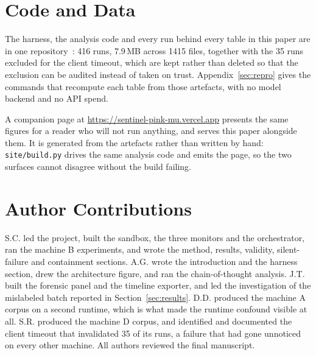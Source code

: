 \section*{Code and Data}

The harness, the analysis code and every run behind every table in this paper
are in one repository~\cite{sentinel-repo}: 416 runs, 7.9\,MB across 1415
files, together with the 35 runs excluded for the client timeout, which are
kept rather than deleted so that the exclusion can be audited instead of
taken on trust. Appendix~\ref{sec:repro} gives the commands that recompute
each table from those artefacts, with no model backend and no API spend.

A companion page at \url{https://sentinel-pink-mu.vercel.app} presents the
same figures for a reader who will not run anything, and serves this paper
alongside them. It is generated from the artefacts rather than written by
hand: \texttt{site/build.py} drives the same analysis code and emits the page,
so the two surfaces cannot disagree without the build failing.

\section*{Author Contributions}

S.C. led the project, built the sandbox, the three monitors and the
orchestrator, ran the machine B experiments, and wrote the method, results,
validity, silent-failure and containment sections. A.G. wrote the
introduction and the harness section, drew the architecture figure, and ran
the chain-of-thought analysis. J.T. built the forensic panel and the timeline
exporter, and led the investigation of the mislabeled batch reported in
Section~\ref{sec:results}. D.D. produced the machine A corpus on a second
runtime, which is what made the runtime confound visible at all. S.R.
produced the machine D corpus, and identified and documented the client
timeout that invalidated 35 of its runs, a failure that had gone unnoticed on
every other machine. All authors reviewed the final manuscript.
